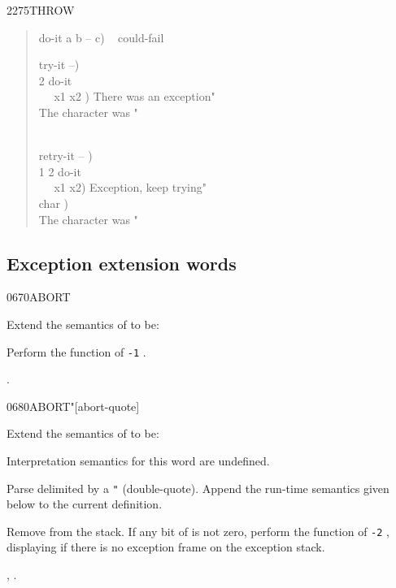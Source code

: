 \begin{worddef}{2275}{THROW}
\begin{defer}
\begin{quote}
		\word{:} do-it  a b -- c) ~
			 could-fail \word{;}

		\word{:} try-it  --) \\
		 2 \word{[']} do-it~ ~  \\
		\tab~~  x1 x2 ) 
			  There was an exception"  \\
		\tab {}
			 The character was "   \\
		\tab {} \\
		\word{;}

		\word{;} retry-it  -- ) \\
		\tab {}  1 2 \word{[']} do-it ~
			 \\
		\tab~~  x1 x2) 
			 Exception, keep trying"  \\
		\tab {}  char ) \\
		\tab {} The character was "   \\
		\word{;}
	\end{quote}
\end{defer}
\end{worddef}


\subsection{Exception extension words} %
\extended

\begin{worddef}{0670}{ABORT}
\item Extend the semantics of  to be:


	Perform the function of \texttt{-1} .

\see {}.
\end{worddef}


\begin{worddef}[ABORTq]{0680}{ABORT"}[abort-quote]
\item Extend the semantics of  to be:

\interpret
	Interpretation semantics for this word are undefined.

\compile

	Parse  delimited by a \texttt{"} (double-quote).
	Append the run-time semantics given below to the current
	definition.

\runtime

	Remove  from the stack. If any bit of 
	is not zero, perform the function of \texttt{-2} ,
	displaying  if there is no exception frame on the
	exception stack.

\see {},
	.
\end{worddef}
